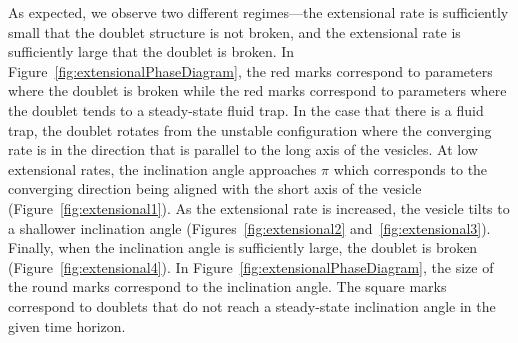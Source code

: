 \documentclass[prf,superscriptaddress,showpacs]{revtex4-1}
\begin{document}
As expected, we observe two different regimes---the extensional rate is
sufficiently small that the doublet structure is not broken, and the
extensional rate is sufficiently large that the doublet is broken.  In
Figure~\ref{fig:extensionalPhaseDiagram}, the red marks correspond to
parameters where the doublet is broken while the red marks correspond to
parameters where the doublet tends to a steady-state fluid trap.  In the
case that there is a fluid trap, the doublet rotates from the unstable
configuration where the converging rate is in the direction that is
parallel to the long axis of the vesicles.  At low extensional rates,
the inclination angle approaches $\pi$ which corresponds to the
converging direction being aligned with the short axis of the vesicle
(Figure~\ref{fig:extensional1}).  As the extensional rate is increased,
the vesicle tilts to a shallower inclination angle
(Figures~\ref{fig:extensional2} and~\ref{fig:extensional3}).  Finally,
when the inclination angle is sufficiently large, the doublet is broken
(Figure~\ref{fig:extensional4}).  In
Figure~\ref{fig:extensionalPhaseDiagram}, the size of the round marks
correspond to the inclination angle.  The square marks correspond to
doublets that do not reach a steady-state inclination angle in the given
time horizon.
\end{document}

